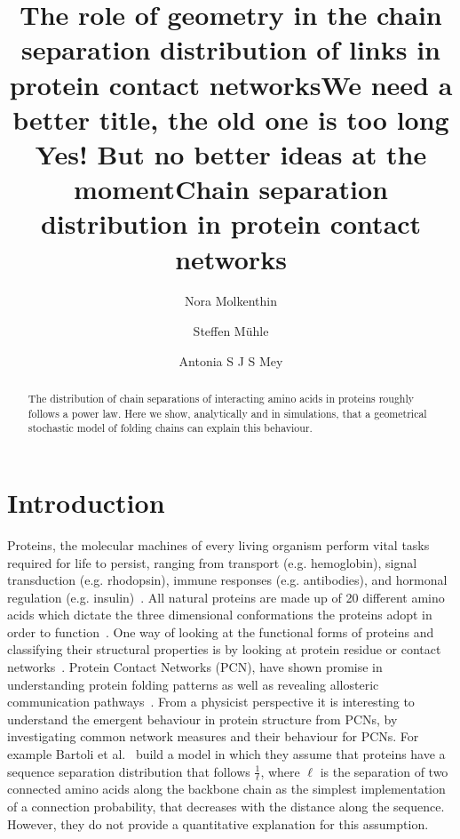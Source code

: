 \documentclass[reprint,amsmath,amssymb,rmp,onecolumn,notitlepage,11pt]{revtex4-1}
\newcommand{\red}[1]{\textcolor{red!80!black}{#1}}
\newcommand{\green}[1]{\textcolor{green!70!black}{#1}}
\begin{document}
\title{The role of geometry in the chain separation distribution of links in protein contact networks}
\title{\red{We need a better title, the old one is too long} \green{Yes! But no better ideas at the moment}}
\title{\red{Chain separation distribution in protein contact networks}}
\author{Nora Molkenthin}
\author{Steffen Mühle}
\author{Antonia S J S Mey}

\begin{abstract}
The distribution of chain separations of interacting amino acids in proteins roughly follows a power law. Here we show, analytically and in simulations, that a geometrical stochastic model of folding chains can explain this behaviour. 
\end{abstract}
\maketitle

\section*{Introduction}
Proteins, the molecular machines of every living organism perform vital tasks required for life to persist, ranging from transport (e.g. hemoglobin), signal transduction (e.g. rhodopsin), immune responses (e.g. antibodies), and hormonal regulation (e.g. insulin)~\cite{something}. All natural proteins are made up of 20 different amino acids which dictate the three dimensional conformations the proteins adopt in order to function~\cite{stuff}. One way of looking at the functional forms of proteins and classifying their structural properties is by looking at protein residue or contact networks~\cite{Vendruscolo2002,DiPaola2013,Estrada2011}. Protein Contact Networks (PCN), have shown promise in understanding protein folding patterns as well as revealing allosteric communication pathways~\cite{https://pubs.acs.org/doi/10.1021/acs.jcim.9b00320, and others}. 
From a physicist perspective it is interesting to understand the emergent behaviour in protein structure from PCNs, by investigating common network measures and their behaviour for PCNs. For example Bartoli et al.~\cite{bartoli2008effect} build a model in which they assume that proteins have a sequence separation distribution that follows $\frac{1}{\ell}$, where $\ell$ is the separation of two connected amino acids along the backbone chain as the simplest implementation of a connection probability, that decreases with the distance along the sequence. However, they do not provide a quantitative explanation for this assumption. 
\end{document}
